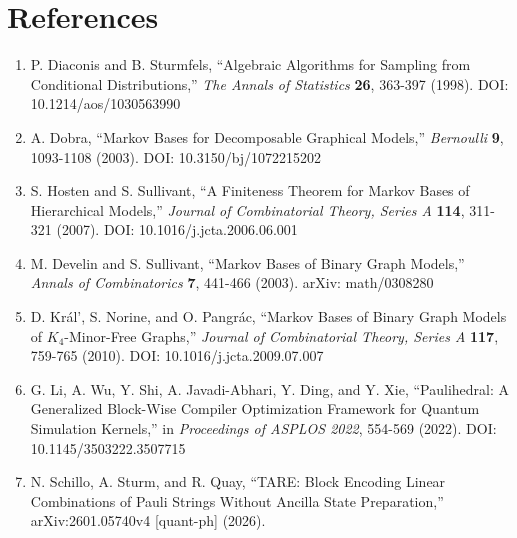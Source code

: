 \documentclass[
  11pt,
]{article}
\providecommand{\tightlist}{%
  \setlength{\itemsep}{0pt}\setlength{\parskip}{0pt}}
\begin{document}
\hypertarget{references}{%
\section{References}\label{references}}

\begin{enumerate}
\def\labelenumi{\arabic{enumi}.}
\tightlist
\item
  P. Diaconis and B. Sturmfels, ``Algebraic Algorithms for Sampling from
  Conditional Distributions,'' \emph{The Annals of Statistics}
  \textbf{26}, 363-397 (1998). DOI: 10.1214/aos/1030563990
\item
  A. Dobra, ``Markov Bases for Decomposable Graphical Models,''
  \emph{Bernoulli} \textbf{9}, 1093-1108 (2003). DOI:
  10.3150/bj/1072215202
\item
  S. Hosten and S. Sullivant, ``A Finiteness Theorem for Markov Bases of
  Hierarchical Models,'' \emph{Journal of Combinatorial Theory, Series
  A} \textbf{114}, 311-321 (2007). DOI: 10.1016/j.jcta.2006.06.001
\item
  M. Develin and S. Sullivant, ``Markov Bases of Binary Graph Models,''
  \emph{Annals of Combinatorics} \textbf{7}, 441-466 (2003). arXiv:
  math/0308280
\item
  D. Král', S. Norine, and O. Pangrác, ``Markov Bases of Binary Graph
  Models of \(K_4\)-Minor-Free Graphs,'' \emph{Journal of Combinatorial
  Theory, Series A} \textbf{117}, 759-765 (2010). DOI:
  10.1016/j.jcta.2009.07.007
\item
  G. Li, A. Wu, Y. Shi, A. Javadi-Abhari, Y. Ding, and Y. Xie,
  ``Paulihedral: A Generalized Block-Wise Compiler Optimization
  Framework for Quantum Simulation Kernels,'' in \emph{Proceedings of
  ASPLOS 2022}, 554-569 (2022). DOI: 10.1145/3503222.3507715
\item
  N. Schillo, A. Sturm, and R. Quay, ``TARE: Block Encoding Linear
  Combinations of Pauli Strings Without Ancilla State Preparation,''
  arXiv:2601.05740v4 {[}quant-ph{]} (2026).
\end{enumerate}
\end{document}
